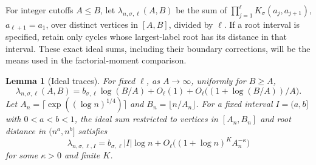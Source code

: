 \documentclass[11pt]{article}
\newtheorem{lemma}[theorem]{Lemma}
\theoremstyle{remark}
\theoremstyle{plain}
\begin{document}
For integer cutoffs $A\le B$, let $\lambda_{n,\sigma,\ell}(A,B)$ be the
sum of $\prod_{j=1}^\ell K_\sigma(a_j,a_{j+1})$, $a_{\ell+1}=a_1$,
over distinct vertices in $[A,B]$, divided by $\ell$.  If a root interval
is specified, retain only cycles whose largest-label root has its
distance in that interval.  These exact ideal sums, including their
boundary corrections, will be the means used in the factorial-moment
comparison.

\begin{lemma}[Ideal traces]\label{lem:sp-ideal-traces}
For fixed $\ell$, as $A\to\infty$, uniformly for $B\ge A$,
\begin{equation}\label{eq:sp-ideal-total}
 \lambda_{n,\sigma,\ell}(A,B)
 =b_{\sigma,\ell}\log(B/A)+O_\ell(1)
   +O_\ell\bigl((1+\log(B/A))/A\bigr).
\end{equation}
Let $A_n=\lceil\exp((\log n)^{1/4})\rceil$ and
$B_n=\lfloor n/A_n\rfloor$.  For a fixed interval
$I=(a,b]$ with $0<a<b<1$, the ideal sum restricted to vertices in
$[A_n,B_n]$ and root distance in $(n^a,n^b]$ satisfies
\begin{equation}\label{eq:sp-ideal-spatial}
 \lambda_{n,\sigma,\ell,I}
 =b_{\sigma,\ell}|I|\log n
   +O_\ell\bigl((1+\log n)^K A_n^{-\kappa}\bigr)
\end{equation}
for some $\kappa>0$ and finite $K$.
\end{lemma}
\end{document}
